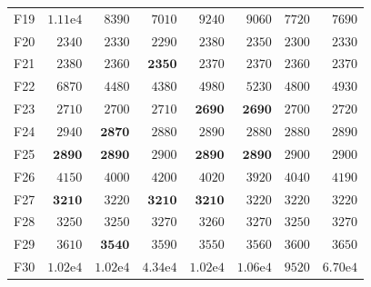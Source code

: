 \begin{tabular}{lrrrrrrr}
F19 & $1.11\mathrm{e}{4}$ & $8390$ & $7010$ & $9240$ & $9060$ & $7720$ & $7690$ \\
F20 & $2340$ & $2330$ & $2290$ & $2380$ & $2350$ & $2300$ & $2330$ \\
F21 & $2380$ & $2360$ & $\mathbf{2350}$ & $2370$ & $2370$ & $2360$ & $2370$ \\
F22 & $6870$ & $4480$ & $4380$ & $4980$ & $5230$ & $4800$ & $4930$ \\
F23 & $2710$ & $2700$ & $2710$ & $\mathbf{2690}$ & $\mathbf{2690}$ & $2700$ & $2720$ \\
F24 & $2940$ & $\mathbf{2870}$ & $2880$ & $2890$ & $2880$ & $2880$ & $2890$ \\
F25 & $\mathbf{2890}$ & $\mathbf{2890}$ & $2900$ & $\mathbf{2890}$ & $\mathbf{2890}$ & $2900$ & $2900$ \\
F26 & $4150$ & $4000$ & $4200$ & $4020$ & $3920$ & $4040$ & $4190$ \\
F27 & $\mathbf{3210}$ & $3220$ & $\mathbf{3210}$ & $\mathbf{3210}$ & $3220$ & $3220$ & $3220$ \\
F28 & $3250$ & $3250$ & $3270$ & $3260$ & $3270$ & $3250$ & $3270$ \\
F29 & $3610$ & $\mathbf{3540}$ & $3590$ & $3550$ & $3560$ & $3600$ & $3650$ \\
F30 & $1.02\mathrm{e}{4}$ & $1.02\mathrm{e}{4}$ & $4.34\mathrm{e}{4}$ & $1.02\mathrm{e}{4}$ & $1.06\mathrm{e}{4}$ & $9520$ & $6.70\mathrm{e}{4}$ \\
\bottomrule
\end{tabular}
